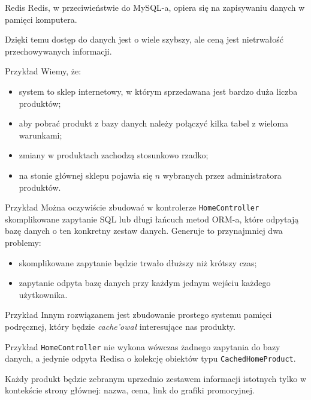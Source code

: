 \begin{frame}{Redis}	
	Redis, w przeciwieństwie do MySQL-a, opiera się na zapisywaniu danych w pamięci komputera. 
	
	Dzięki temu dostęp do danych jest o wiele szybszy, ale ceną jest nietrwałość przechowywanych informacji.
\end{frame}

\begin{frame}{Przykład}
	Wiemy, że:
	
	\begin{itemize}
		\item system to sklep internetowy, w którym sprzedawana jest bardzo duża liczba produktów;
		\item aby pobrać produkt z bazy danych należy połączyć kilka tabel z wieloma warunkami;
		\item zmiany w produktach zachodzą stosunkowo rzadko;
		\item na stonie głównej sklepu pojawia się $n$ wybranych przez administratora produktów.
	\end{itemize}
\end{frame}

\begin{frame}{Przykład}
	Można oczywiście zbudować w kontrolerze \texttt{HomeController} skomplikowane zapytanie SQL lub długi łańcuch metod ORM-a, które odpytają bazę danych o ten konkretny zestaw danych. Generuje to przynajmniej dwa problemy:
	
	\begin{itemize}
		\item skomplikowane zapytanie będzie trwało dłuższy niż krótszy czas;
		\item zapytanie odpyta bazę danych przy każdym jednym wejściu każdego użytkownika.
	\end{itemize}
\end{frame}

\begin{frame}{Przykład}
	Innym rozwiązanem jest zbudowanie prostego systemu pamięci podręcznej, który będzie \emph{cache'ował} interesujące nas produkty.
\end{frame}

\begin{frame}{Przykład}	
	\texttt{HomeController} nie wykona wówczas żadnego zapytania do bazy danych, a jedynie odpyta Redisa o kolekcję obiektów typu \texttt{CachedHomeProduct}.
	
	Każdy produkt będzie zebranym uprzednio zestawem informacji istotnych tylko w kontekście strony głównej: nazwa, cena, link do grafiki promocyjnej.
\end{frame}

